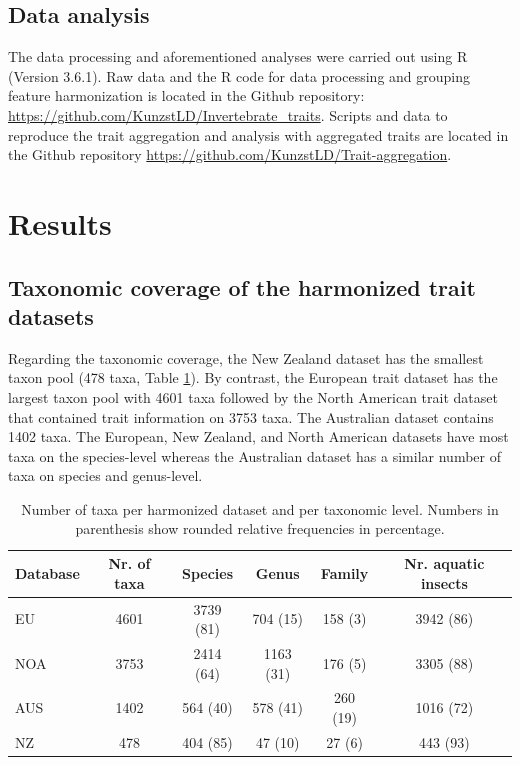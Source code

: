 \documentclass{article}
\begin{document}

\subsection*{Data analysis}

The data processing and aforementioned analyses were carried out using R (Version 3.6.1). Raw data and the R code for data processing and grouping feature harmonization is located in the Github repository: \url{https://github.com/KunzstLD/Invertebrate_traits}. Scripts and data to reproduce the trait aggregation and analysis with aggregated traits are located in the Github repository \url{https://github.com/KunzstLD/Trait-aggregation}.


\newpage
\section*{Results}

\subsection*{Taxonomic coverage of the harmonized trait datasets}

Regarding the taxonomic coverage, the New Zealand dataset has the smallest taxon pool (478 taxa, Table \ref{tab:tax_coverage}). By contrast, the European trait dataset has the largest taxon pool with 4601 taxa followed by the North American trait dataset that contained trait information on 3753 taxa. The Australian dataset contains 1402 taxa. The European, New Zealand, and North American datasets have most taxa on the species-level whereas the Australian dataset has a similar number of taxa on species and genus-level.

\begin{table}[ht]
    \centering
    \caption{Number of taxa per harmonized dataset and per taxonomic level. Numbers in parenthesis show rounded relative frequencies in percentage.} 
    \label{tab:tax_coverage}
    \begin{tabular}{lccccc}
    \toprule[.1em]
    Database & Nr. of taxa & Species & Genus & Family & Nr. aquatic insects \\ 
    \toprule[.1em]
    EU & 4601 & 3739 (81) & 704 (15) & 158 (3) & 3942 (86) \\ 
    NOA & 3753 & 2414 (64) & 1163 (31) & 176 (5) & 3305 (88) \\ 
    AUS & 1402 & 564 (40) & 578 (41) & 260 (19) & 1016 (72) \\ 
    NZ & 478 & 404 (85) & 47 (10) & 27 (6) & 443 (93) \\ 
    \bottomrule
    \end{tabular}
\end{table}
\end{document}
